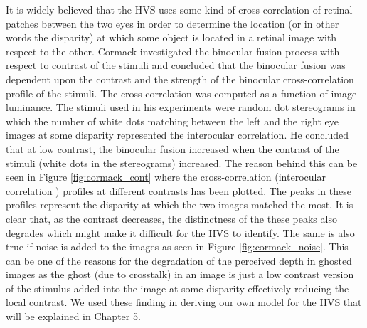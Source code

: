 It is widely believed that the HVS uses some kind of cross-correlation of retinal patches between the two eyes in order to determine the location (or in other words the disparity) at which some object is located in a retinal image with respect to the other. Cormack \cite{cormack1991interocular} investigated the binocular fusion process with respect to contrast of the stimuli and concluded that the binocular fusion was dependent upon the contrast and the strength of the binocular cross-correlation profile of the stimuli. The cross-correlation was computed as a function of image luminance. The stimuli used in his experiments were random dot stereograms in which the number of white dots matching between the left and the right eye images at some disparity represented the interocular correlation. He concluded that at low contrast, the binocular fusion increased when the contrast of the stimuli (white dots in the stereograms) increased. The reason behind this can be seen in Figure \ref{fig:cormack_cont} where the cross-correlation (interocular correlation ) profiles at different contrasts has been plotted. The peaks in these profiles represent the disparity at which the two images matched the most. It is clear that, as the contrast decreases, the distinctness of the these peaks also degrades which might make it difficult for the HVS to identify. The same is also true if noise is added to the images as seen in Figure \ref{fig:cormack_noise}. This can be one of the reasons for the degradation of the perceived depth in ghosted images as the ghost (due to crosstalk) in an image is just a low contrast version of the stimulus added into the image at some disparity effectively reducing the local contrast. We used these finding in deriving our own model for the HVS that will be explained in Chapter 5.

